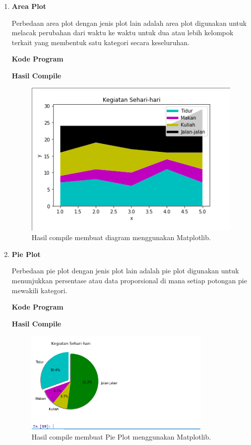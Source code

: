 \begin{enumerate}
	\item \textbf{Area Plot}
	
	Perbedaan area plot dengan jenis plot lain adalah area plot digunakan untuk melacak perubahan dari waktu ke waktu untuk dua atau lebih kelompok terkait yang membentuk satu kategori secara keseluruhan.
	
	\textbf{Kode Program}
	
	
	
	\textbf{Hasil Compile}
	
	\begin{figure}[H]
		\includegraphics[width=12cm]{figures/6/1174089/Praktek/area.png}
		\centering
		\caption{Hasil compile membuat diagram menggunakan Matplotlib.}
	\end{figure}
	
	\item \textbf{Pie Plot}
	
	Perbedaan pie plot dengan jenis plot lain adalah pie plot digunakan untuk menunjukkan persentase atau data proporsional di mana setiap potongan pie mewakili kategori.
	
	\textbf{Kode Program}
	
	
	
	\textbf{Hasil Compile}
	
	\begin{figure}[H]
		\includegraphics[width=9cm]{figures/6/1174089/Praktek/pie.png}
		\centering
		\caption{Hasil compile membuat Pie Plot menggunakan Matplotlib.}
	\end{figure}
	

\end{enumerate}
